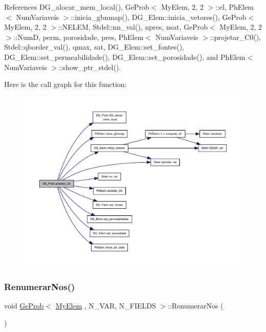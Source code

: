 References D\+G\+\_\+alocar\+\_\+mem\+\_\+local(), Ge\+Prob$<$ My\+Elem, 2, 2 $>$\+::el, Ph\+Elem$<$ Num\+Variaveis $>$\+::inicia\+\_\+gbnmap(), D\+G\+\_\+\+Elem\+::inicia\+\_\+vetores(), Ge\+Prob$<$ My\+Elem, 2, 2 $>$\+::\+N\+E\+L\+EM, Stdel\+::nn\+\_\+val(), npres, nsat, Ge\+Prob$<$ My\+Elem, 2, 2 $>$\+::\+NumD, perm, porosidade, pres, Ph\+Elem$<$ Num\+Variaveis $>$\+::projetar\+\_\+\+C0(), Stdel\+::qborder\+\_\+val(), qmax, sat, D\+G\+\_\+\+Elem\+::set\+\_\+fontes(), D\+G\+\_\+\+Elem\+::set\+\_\+permeabilidade(), D\+G\+\_\+\+Elem\+::set\+\_\+porosidade(), and Ph\+Elem$<$ Num\+Variaveis $>$\+::show\+\_\+ptr\+\_\+stdel().

Here is the call graph for this function\+:
\nopagebreak
\begin{figure}[H]
\begin{center}
\leavevmode
\includegraphics[width=350pt]{classDG__Prob_acbf4eefc45872a673a1491b776921d31_cgraph}
\end{center}
\end{figure}
\mbox{\label{classGeProb_a18cfc81b7accb83b55b9e69d2738c5de}} 
\subsubsection{\texorpdfstring{Renumerar\+Nos()}{RenumerarNos()}\hspace{0.1cm}{\footnotesize\ttfamily [1/2]}}
{\footnotesize\ttfamily void \hyperlink{classGeProb}{Ge\+Prob}$<$ \hyperlink{DG__Prob_8h_a83cd887ced9a6587428f267e50cd4787}{My\+Elem} , N\+\_\+\+V\+AR, N\+\_\+\+F\+I\+E\+L\+DS $>$\+::Renumerar\+Nos (\begin{DoxyParamCaption}{ }\end{DoxyParamCaption})\hspace{0.3cm}{\ttfamily [inherited]}}



